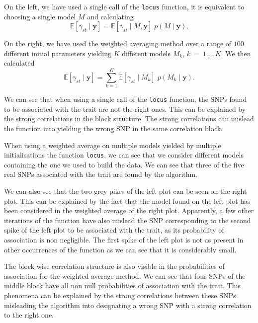 \documentclass[a4paper, 11pt]{report}
\numberwithin{equation}{chapter}
\begin{document}
On the left, we have used a single call of the \texttt{locus} function, it is equivalent to choosing a single model $M$ and calculating
\begin{equation*}
\mathbb{E}\left[\gamma_{st}\mid\boldsymbol{y}\right] = \mathbb{E}\left[\gamma_{st}\mid M,\boldsymbol{y}\right]\;p\left(M\mid\boldsymbol{y}\right).
\end{equation*}

On the right, we have used the weighted averaging method over a range of $100$ different initial parameters yielding $K$ different models $ M_k$, $k~=~1\ldots,K$. We then calculated
\begin{equation*}
\mathbb{E}\left[\gamma_{st}\mid\boldsymbol{y}\right] = \sum_{k=1}^K\mathbb{E}\left[\gamma_{st}\mid M_k\right]\;p\left(M_k\mid\boldsymbol{y}\right).
\end{equation*}

We can see that when using a single call of the \texttt{locus} function, the SNPs found to be associated with the trait are not the right ones. This can be explained by the strong correlations in the block structure. The strong correlations can mislead the function into yielding the wrong SNP in the same correlation block.

When using a weighted average on multiple models yielded by multiple initialisations the function \texttt{locus}, we can see that we consider different models containing the one we used to build the data. We can see that three of the five real SNPs associated with the trait are found by the algorithm.

We can also see that the two grey pikes of the left plot can be seen on the right plot. This can be explained by the fact that the model found on the left plot has been considered in the weighted average of the right plot. Apparently, a few other iterations of the function have also mislead the SNP corresponding to the second spike of the left plot to be associated with the trait, as its probability of association is non negligible. The first spike of the left plot is not as present in other occurrences of the function as we can see that it is considerably small.

The block wise correlation structure is also visible in the probabilities of association for the weighted average method. We can see that four SNPs of the middle block have all non null probabilities of association with the trait. This phenomena can be explained by the strong correlations between these SNPs misleading the algorithm into designating a wrong SNP with a strong correlation to the right one.
\end{document}
